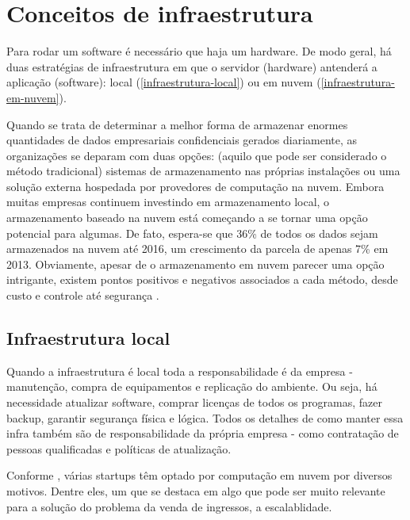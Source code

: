 \chapter{Conceitos de infraestrutura}

Para rodar um software é necessário que haja um hardware. De modo geral,
há duas estratégias de infraestrutura em que o servidor (hardware) antenderá a aplicação (software):
local (\autoref{infraestrutura-local}) ou em nuvem (\autoref{infraestrutura-em-nuvem}).

\begin{citacao}

Quando se trata de determinar a melhor forma de armazenar enormes quantidades de
dados empresariais confidenciais gerados diariamente, as organizações se deparam
com duas opções: (aquilo que pode ser considerado o método tradicional) sistemas
de armazenamento nas próprias instalações ou uma solução externa hospedada por
provedores de computação na nuvem. Embora muitas empresas continuem investindo
em armazenamento local, o armazenamento baseado na nuvem está começando a se
tornar uma opção potencial para algumas. De fato, espera-se que 36\% de todos
os dados sejam armazenados na nuvem até 2016, um crescimento da parcela de
apenas 7\% em 2013. Obviamente, apesar de o armazenamento em nuvem parecer
uma opção intrigante, existem pontos positivos e negativos associados a cada
método, desde custo e controle até segurança \cite{armazenamento-no-local-ou-na-nuvem}.

\end{citacao}

\section{Infraestrutura local}\label{infraestrutura-local}

Quando a infraestrutura é local toda a responsabilidade é da empresa - manutenção,
compra de equipamentos e replicação do ambiente.
Ou seja, há necessidade atualizar software, comprar licenças de todos os programas,
fazer backup, garantir segurança física e lógica.
Todos os detalhes de como manter essa infra também são de responsabilidade da própria empresa -
como contratação de pessoas qualificadas e políticas de atualização.

Conforme \cite{beneficios-da-computacao-em-nuvem-para-sua-startup}, várias startups
têm optado por computação em nuvem por diversos motivos. Dentre eles, um que se destaca
em algo que pode ser muito relevante para a solução do problema da venda de ingressos,
a escalablidade.

